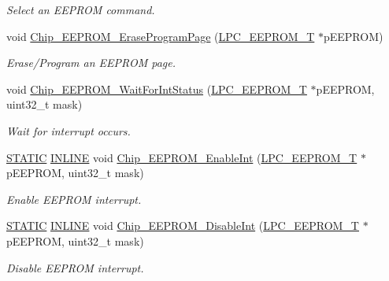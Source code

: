 \begin{DoxyCompactItemize}
\begin{DoxyCompactList}\small\item\em Select an E\+E\+P\+R\+OM command. \end{DoxyCompactList}\item 
void \hyperlink{group___e_e_p_r_o_m__18_x_x__43_x_x_ga9bd675e4d0579705d04c2948cc22cfe0}{Chip\+\_\+\+E\+E\+P\+R\+O\+M\+\_\+\+Erase\+Program\+Page} (\hyperlink{struct_l_p_c___e_e_p_r_o_m___t}{L\+P\+C\+\_\+\+E\+E\+P\+R\+O\+M\+\_\+T} $\ast$p\+E\+E\+P\+R\+OM)
\begin{DoxyCompactList}\small\item\em Erase/\+Program an E\+E\+P\+R\+OM page. \end{DoxyCompactList}\item 
void \hyperlink{group___e_e_p_r_o_m__18_x_x__43_x_x_ga9bf344a5bd3a2035573b2d080f11c484}{Chip\+\_\+\+E\+E\+P\+R\+O\+M\+\_\+\+Wait\+For\+Int\+Status} (\hyperlink{struct_l_p_c___e_e_p_r_o_m___t}{L\+P\+C\+\_\+\+E\+E\+P\+R\+O\+M\+\_\+T} $\ast$p\+E\+E\+P\+R\+OM, uint32\+\_\+t mask)
\begin{DoxyCompactList}\small\item\em Wait for interrupt occurs. \end{DoxyCompactList}\item 
\hyperlink{group___l_p_c___types___public___macros_ga10b2d890d871e1489bb02b7e70d9bdfb}{S\+T\+A\+T\+IC} \hyperlink{spifi__18xx__43xx_8h_a2eb6f9e0395b47b8d5e3eeae4fe0c116}{I\+N\+L\+I\+NE} void \hyperlink{group___e_e_p_r_o_m__18_x_x__43_x_x_gad2c0da142f469adc4467b4d230b5532b}{Chip\+\_\+\+E\+E\+P\+R\+O\+M\+\_\+\+Enable\+Int} (\hyperlink{struct_l_p_c___e_e_p_r_o_m___t}{L\+P\+C\+\_\+\+E\+E\+P\+R\+O\+M\+\_\+T} $\ast$p\+E\+E\+P\+R\+OM, uint32\+\_\+t mask)
\begin{DoxyCompactList}\small\item\em Enable E\+E\+P\+R\+OM interrupt. \end{DoxyCompactList}\item 
\hyperlink{group___l_p_c___types___public___macros_ga10b2d890d871e1489bb02b7e70d9bdfb}{S\+T\+A\+T\+IC} \hyperlink{spifi__18xx__43xx_8h_a2eb6f9e0395b47b8d5e3eeae4fe0c116}{I\+N\+L\+I\+NE} void \hyperlink{group___e_e_p_r_o_m__18_x_x__43_x_x_gac506ec65d1c63a4f2f8bfc7175bea68c}{Chip\+\_\+\+E\+E\+P\+R\+O\+M\+\_\+\+Disable\+Int} (\hyperlink{struct_l_p_c___e_e_p_r_o_m___t}{L\+P\+C\+\_\+\+E\+E\+P\+R\+O\+M\+\_\+T} $\ast$p\+E\+E\+P\+R\+OM, uint32\+\_\+t mask)
\begin{DoxyCompactList}\small\item\em Disable E\+E\+P\+R\+OM interrupt. \end{DoxyCompactList}\item 

\end{DoxyCompactItemize}
